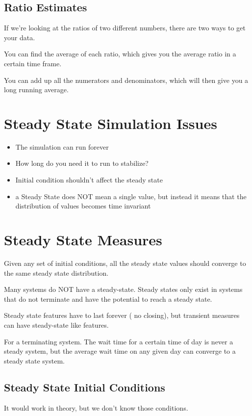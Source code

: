 \documentclass[fleqn]{report}
\begin{document}
\subsection{Ratio Estimates}
If we're looking at the ratios of two different numbers, there are two ways to 
get your data. 

You can find the average of each ratio, which gives you the average 
ratio in a certain time frame. 

You can add up all the numerators and denominators, which will then give 
you a long running average. 

\section{Steady State Simulation Issues}
\begin{itemize}
    \item 
    The simulation can run forever 
    \item 
    How long do you need it to run to stabilize? 
    \item 
    Initial condition shouldn't affect the steady state 
    \item 
    a Steady State does NOT mean a single value, but instead
    it means that the distribution of values becomes time invariant 
\end{itemize}

\section{Steady State Measures}
Given any set of initial conditions, all the steady state values should 
converge to the same steady state distribution. 

Many systems do NOT have a steady-state. Steady states only exist in systems 
that do not terminate and have the potential to reach a steady state. 

Steady state features have to last forever ( no closing), but transient 
measures can have steady-state like features. 

For a terminating system. The wait time for a certain time of day is never 
a steady system, but the average wait time on any given day can converge 
to a steady state system. 

\subsection{Steady State Initial Conditions}
It would work in theory, but we don't know those conditions. 
\end{document}
